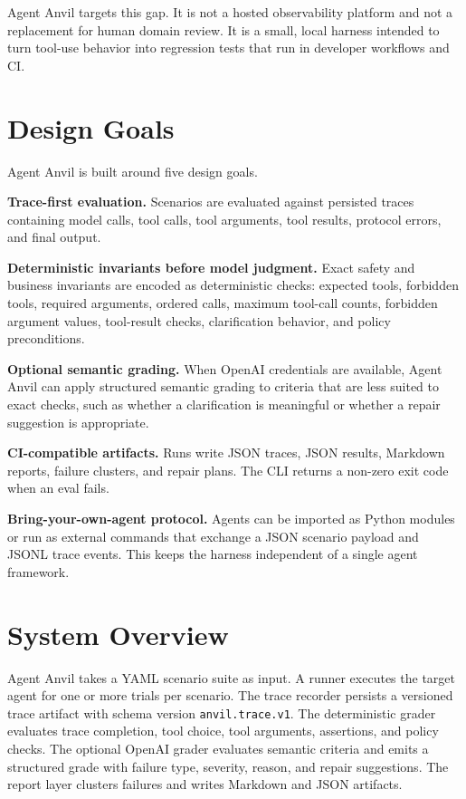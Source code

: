\documentclass[11pt]{article}
\begin{document}
Agent Anvil targets this gap. It is not a hosted observability platform and not
a replacement for human domain review. It is a small, local harness intended to
turn tool-use behavior into regression tests that run in developer workflows and
CI.

\section{Design Goals}

Agent Anvil is built around five design goals.

\textbf{Trace-first evaluation.} Scenarios are evaluated against persisted
traces containing model calls, tool calls, tool arguments, tool results,
protocol errors, and final output.

\textbf{Deterministic invariants before model judgment.} Exact safety and
business invariants are encoded as deterministic checks: expected tools,
forbidden tools, required arguments, ordered calls, maximum tool-call counts,
forbidden argument values, tool-result checks, clarification behavior, and
policy preconditions.

\textbf{Optional semantic grading.} When OpenAI credentials are available,
Agent Anvil can apply structured semantic grading to criteria that are less
suited to exact checks, such as whether a clarification is meaningful or
whether a repair suggestion is appropriate.

\textbf{CI-compatible artifacts.} Runs write JSON traces, JSON results,
Markdown reports, failure clusters, and repair plans. The CLI returns a
non-zero exit code when an eval fails.

\textbf{Bring-your-own-agent protocol.} Agents can be imported as Python
modules or run as external commands that exchange a JSON scenario payload and
JSONL trace events. This keeps the harness independent of a single agent
framework.

\section{System Overview}

Agent Anvil takes a YAML scenario suite as input. A runner executes the target
agent for one or more trials per scenario. The trace recorder persists a
versioned trace artifact with schema version \texttt{anvil.trace.v1}. The
deterministic grader evaluates trace completion, tool choice, tool arguments,
assertions, and policy checks. The optional OpenAI grader evaluates semantic
criteria and emits a structured grade with failure type, severity, reason, and
repair suggestions. The report layer clusters failures and writes Markdown and
JSON artifacts.
\end{document}
